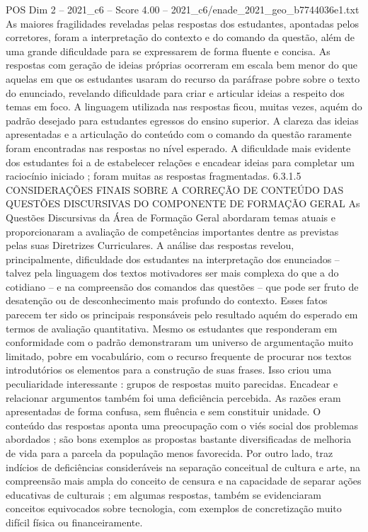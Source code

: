 \begin{textsample}{POS Dim 2 – 2021\_c6 – Score 4.00 – 2021\_c6/enade\_2021\_geo\_b7744036e1.txt}
As maiores fragilidades reveladas pelas respostas dos estudantes, apontadas pelos corretores, foram a interpretação do contexto e do comando da questão, além de uma grande dificuldade para se expressarem de forma fluente e concisa.
As respostas com geração de ideias próprias ocorreram em escala bem menor do que aquelas em que os estudantes usaram do recurso da paráfrase pobre sobre o texto do enunciado, revelando dificuldade para criar e articular ideias a respeito dos temas em foco.
A linguagem utilizada nas respostas ficou, muitas vezes, aquém do padrão desejado para estudantes egressos do ensino superior.
A clareza das ideias apresentadas e a articulação do conteúdo com o comando da questão raramente foram encontradas nas respostas no nível esperado.
A dificuldade mais evidente dos estudantes foi a de estabelecer relações e encadear ideias para completar um raciocínio iniciado ; foram muitas as respostas fragmentadas. 6.3.1.5 CONSIDERAÇÕES FINAIS SOBRE A CORREÇÃO DE CONTEÚDO DAS QUESTÕES DISCURSIVAS DO COMPONENTE DE FORMAÇÃO GERAL As Questões Discursivas da Área de Formação Geral abordaram temas atuais e proporcionaram a avaliação de competências importantes dentre as previstas pelas suas Diretrizes Curriculares.
A análise das respostas revelou, principalmente, dificuldade dos estudantes na interpretação dos enunciados – talvez pela linguagem dos textos motivadores ser mais complexa do que a do cotidiano – e na compreensão dos comandos das questões – que pode ser fruto de desatenção ou de desconhecimento mais profundo do contexto.
Esses fatos parecem ter sido os principais responsáveis pelo resultado aquém do esperado em termos de avaliação quantitativa.
Mesmo os estudantes que responderam em conformidade com o padrão demonstraram um universo de argumentação muito limitado, pobre em vocabulário, com o recurso frequente de procurar nos textos introdutórios os elementos para a construção de suas frases.
Isso criou uma peculiaridade interessante : grupos de respostas muito parecidas.
Encadear e relacionar argumentos também foi uma deficiência percebida.
As razões eram apresentadas de forma confusa, sem fluência e sem constituir unidade.
O conteúdo das respostas aponta uma preocupação com o viés social dos problemas abordados ; são bons exemplos as propostas bastante diversificadas de melhoria de vida para a parcela da população menos favorecida.
Por outro lado, traz indícios de deficiências consideráveis na separação conceitual de cultura e arte, na compreensão mais ampla do conceito de censura e na capacidade de separar ações educativas de culturais ; em algumas respostas, também se evidenciaram conceitos equivocados sobre tecnologia, com exemplos de concretização muito difícil física ou financeiramente.

\end{textsample}
